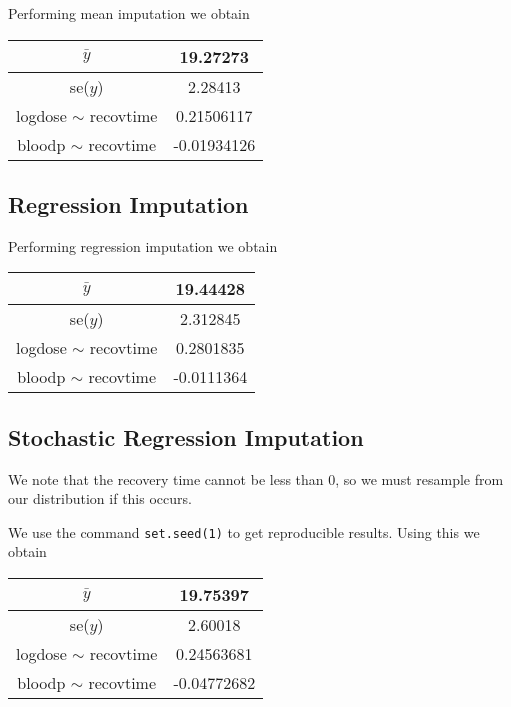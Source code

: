 \documentclass[11pt]{article}
\begin{document}
Performing mean imputation we obtain 

\begin{table}[H]
	\centering
	\begin{tabular}{|c|c|}
		\hline 
		$\bar{y}$ & 19.27273\\ 
		\hline 
		se($y$) & 2.28413\\ 
		\hline 
		logdose $\sim$ recovtime & 0.21506117\\ 
		\hline 
		bloodp $\sim$ recovtime & -0.01934126\\ 
		\hline 
	\end{tabular} 
\end{table}

\subsection*{Regression Imputation}

Performing regression imputation we obtain 

\begin{table}[H]
	\centering
	\begin{tabular}{|c|c|}
		\hline 
		$\bar{y}$ & 19.44428\\ 
		\hline 
		se($y$) & 2.312845\\ 
		\hline 
		logdose $\sim$ recovtime & 0.2801835\\ 
		\hline 
		bloodp $\sim$ recovtime & -0.0111364\\ 
		\hline 
	\end{tabular} 
\end{table}

\subsection*{Stochastic Regression Imputation}

We note that the recovery time cannot be less than 0, so we must resample from our distribution if this occurs.

We use the command \texttt{set.seed(1)} to get reproducible results. Using this we obtain

\begin{table}[H]
	\centering
	\begin{tabular}{|c|c|}
		\hline 
		$\bar{y}$ & 19.75397\\ 
		\hline 
		se($y$) & 2.60018\\ 
		\hline 
		logdose $\sim$ recovtime & 0.24563681\\ 
		\hline 
		bloodp $\sim$ recovtime & -0.04772682\\ 
		\hline 
	\end{tabular} 
\end{table}
\end{document}
